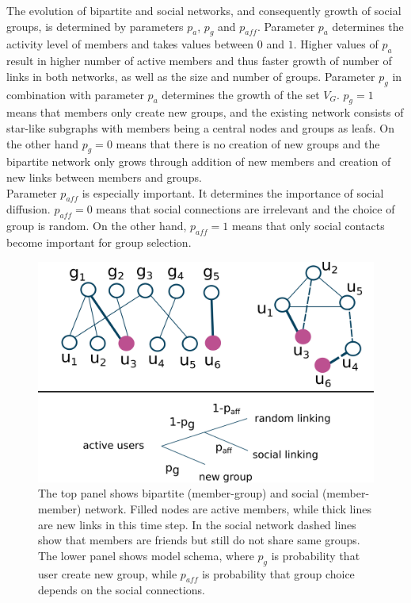The evolution of bipartite and social networks, and consequently growth of social groups, is determined by parameters $p_{a}$, $p_{g}$ and $p_{aff}$. Parameter $p_{a}$ determines the activity level of members and takes values between $0$ and $1$. Higher values of $p_{a}$ result in higher number of active members and thus faster growth of number of links in both networks, as well as the size and number of groups. Parameter $p_{g}$ in combination with parameter $p_{a}$ determines the growth of the set $V_{G}$. $p_{g}=1$ means that members only create new groups, and the existing network consists of star-like subgraphs with members being a central nodes and groups as leafs. On the other hand $p_{g}=0$ means that there is no creation of new groups and the bipartite network only grows through addition of new members and creation of new links between members and groups.\\
Parameter $p_{aff}$ is especially important. It determines the importance of social diffusion. $p_{aff}=0$ means that social connections are irrelevant and the choice of group is random. On the other hand, $p_{aff}=1$ means that only social contacts become important for group selection.\\ 


\begin{figure}[h]
	\centering
	\includegraphics[scale=0.5]{Figures/figures/test.png}
	\caption{The top panel shows bipartite (member-group) and social (member-member) network. Filled nodes are active members, while thick lines are new links in this time step. In the social network dashed lines show that members are friends but still do not share same groups. The lower panel shows model schema, where $p_g$ is probability that user create new group, while $p_{aff}$ is probability that group choice depends on the social connections.}
	\label{fig:schema}
\end{figure}

